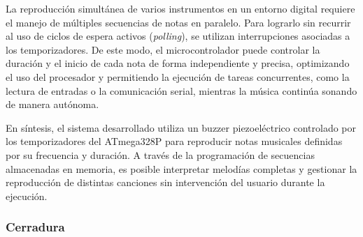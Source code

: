 \vspace{1em}

La reproducción simultánea de varios instrumentos en un entorno digital requiere el manejo de múltiples secuencias de notas en paralelo. Para lograrlo sin recurrir al uso de ciclos de espera activos (\textit{polling}), se utilizan interrupciones asociadas a los temporizadores. De este modo, el microcontrolador puede controlar la duración y el inicio de cada nota de forma independiente y precisa, optimizando el uso del procesador y permitiendo la ejecución de tareas concurrentes, como la lectura de entradas o la comunicación serial, mientras la música continúa sonando de manera autónoma.

\vspace{1em}

En síntesis, el sistema desarrollado utiliza un buzzer piezoeléctrico controlado por los temporizadores del ATmega328P para reproducir notas musicales definidas por su frecuencia y duración. A través de la programación de secuencias almacenadas en memoria, es posible interpretar melodías completas y gestionar la reproducción de distintas canciones sin intervención del usuario durante la ejecución.






\subsubsection{Cerradura}








